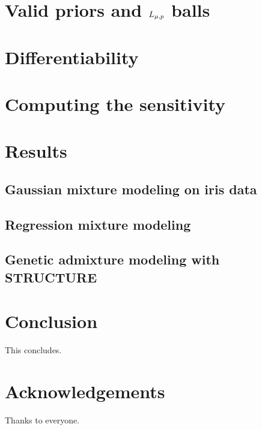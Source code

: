 \documentclass[11pt]{article}
\begin{document}
\section{Valid priors and ${L_{\mu,p}}$ balls}


\section{Differentiability}


\section{Computing the sensitivity}


\section{Results}


    \subsection{Gaussian mixture modeling on iris data}
    

    \subsection{Regression mixture modeling}
    

    \subsection{Genetic admixture modeling with STRUCTURE}
    

\section{Conclusion}
This concludes.


\section{Acknowledgements}
Thanks to everyone.
\end{document}
